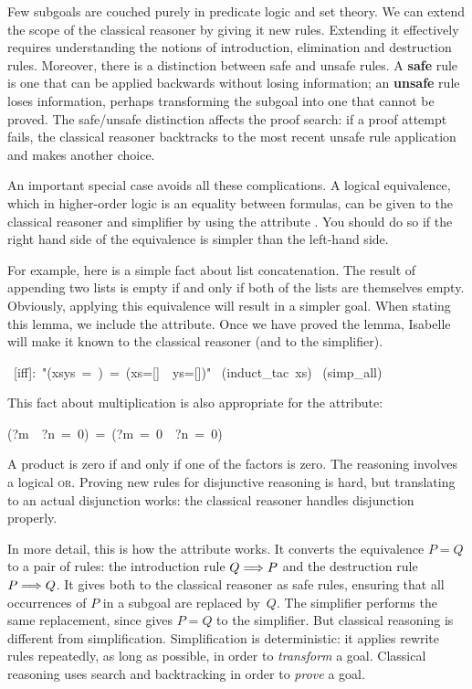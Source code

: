 Few subgoals are couched purely in predicate logic and set theory.
We can extend the scope of the classical reasoner by giving it new rules. 
Extending it effectively requires understanding the notions of
introduction, elimination and destruction rules.  Moreover, there is a
distinction between  safe and unsafe rules. A \textbf{safe} rule is one
that can be applied  backwards without losing information; an
\textbf{unsafe} rule loses  information, perhaps transforming the subgoal
into one that cannot be proved.  The safe/unsafe
distinction affects the proof search: if a proof attempt fails, the
classical reasoner backtracks to the most recent unsafe rule application
and makes another choice. 

An important special case avoids all these complications.  A logical 
equivalence, which in higher-order logic is an equality between 
formulas, can be given to the classical 
reasoner and simplifier by using the attribute {}.  You 
should do so if the right hand side of the equivalence is  
simpler than the left-hand side.  

For example, here is a simple fact about list concatenation. 
The result of appending two lists is empty if and only if both 
of the lists are themselves empty. Obviously, applying this equivalence 
will result in a simpler goal. When stating this lemma, we include 
the {} attribute. Once we have proved the lemma, Isabelle 
will make it known to the classical reasoner (and to the simplifier). 
\begin{isabelle}
\
[iff]:\
"(xs{\isacharat}ys\ =\
\isacharbrackleft{]})\ =\
(xs=[]\
\isacharampersand\
ys=[])"\isanewline
{}\ (induct_tac\
xs)\isanewline
\isacommand{apply}\ (simp_all)
\isanewline
{}
\end{isabelle}
%
This fact about multiplication is also appropriate for 
the {\isa{iff}} attribute:
\begin{isabelle}
(\mbox{?m}\ \isacharasterisk\ \mbox{?n}\ =\ 0)\ =\ (\mbox{?m}\ =\ 0\ \isasymor\ \mbox{?n}\ =\ 0)
\end{isabelle}
A product is zero if and only if one of the factors is zero.  The
reasoning  involves a logical \textsc{or}.  Proving new rules for
disjunctive reasoning  is hard, but translating to an actual disjunction
works:  the classical reasoner handles disjunction properly.

In more detail, this is how the {\isa{iff}} attribute works.  It converts
the equivalence $P=Q$ to a pair of rules: the introduction
rule $Q\Longrightarrow P$ and the destruction rule $P\Longrightarrow Q$.  It gives both to the
classical reasoner as safe rules, ensuring that all occurrences of $P$ in
a subgoal are replaced by~$Q$.  The simplifier performs the same
replacement, since \isa{iff} gives $P=Q$ to the
simplifier.  But classical reasoning is different from
simplification.  Simplification is deterministic: it applies rewrite rules
repeatedly, as long as possible, in order to \emph{transform} a goal.  Classical
reasoning uses search and backtracking in order to \emph{prove} a goal. 


